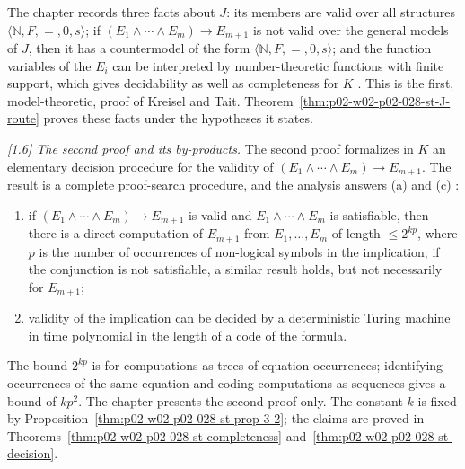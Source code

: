 The chapter records three facts about \(J\): its members are valid over all
structures \(\langle\mathbb N,F,=,0,s\rangle\); if
\((E_1\land\cdots\land E_m)\to E_{m+1}\) is not valid over the general models
of \(J\), then it has a countermodel of the form
\(\langle\mathbb N,F,=,0,s\rangle\); and the function variables of the
\(E_i\) can be interpreted by number-theoretic functions with finite support,
which gives decidability as well as completeness for \(K\)
\cite[\S1.5, p.~900]{Statman1977}.  This is the first, model-theoretic, proof
of Kreisel and Tait.  Theorem~\ref{thm:p02-w02-p02-028-st-J-route} proves
these facts under the hypotheses it states.

\emph{[1.6] The second proof and its by-products.}  The second proof
formalizes in \(K\) an elementary decision procedure for the validity of
\((E_1\land\cdots\land E_m)\to E_{m+1}\).  The result is a complete
proof-search procedure, and the analysis answers (a) and (c)
\cite[\S1.6, p.~900]{Statman1977}:
\begin{enumerate}
  \item[(a)] if \((E_1\land\cdots\land E_m)\to E_{m+1}\) is valid and
        \(E_1\land\cdots\land E_m\) is satisfiable, then there is a direct
        computation of \(E_{m+1}\) from \(E_1,\ldots,E_m\) of length
        \(\leq2^{kp}\), where \(p\) is the number of occurrences of
        non-logical symbols in the implication; if the conjunction is not
        satisfiable, a similar result holds, but not necessarily for
        \(E_{m+1}\);
  \item[(c)] validity of the implication can be decided by a deterministic
        Turing machine in time polynomial in the length of a code of the
        formula.
\end{enumerate}
The bound \(2^{kp}\) is for computations as trees of equation occurrences;
identifying occurrences of the same equation and coding computations as
sequences gives a bound of \(kp^2\).  The chapter presents the second proof
only.  The constant \(k\) is fixed by
Proposition~\ref{thm:p02-w02-p02-028-st-prop-3-2}; the claims are proved in
Theorems~\ref{thm:p02-w02-p02-028-st-completeness}
and~\ref{thm:p02-w02-p02-028-st-decision}.

